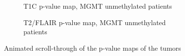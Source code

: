 \begin{subappendices}
\begin{figure}[H]
        \begin{subfigure}[t]{0.4\textwidth}
            \centering
            \caption{\acrshort{T1C} p-value map, \acrshort{MGMT} unmethylated patients}\label{fig:HGG_loc_T1_p_value_map_unmethylated}
        \end{subfigure}
        \hfill
        \begin{subfigure}[t]{0.4\textwidth}
            \centering
            \caption{\acrshort{T2}/\acrshort{FLAIR} p-value map, \acrshort{MGMT} unmethylated patients}\label{fig:HGG_loc_T2_p_value_map_unmethylated}
        \end{subfigure}
        \caption{Animated scroll-through of the p-value maps of the \glspl{tumor}}\label{fig:HGG_loc_p_value_map_full}
    \end{figure}
\end{subappendices}

